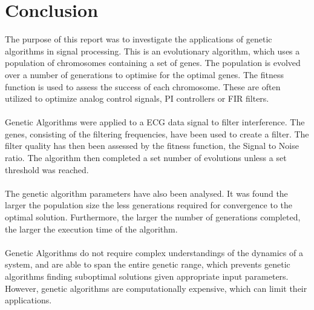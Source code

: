 \documentclass[a4paper, 11pt]{article}
\begin{document}
\section{Conclusion}\label{sec:conc}
    The purpose of this report was to investigate the applications of genetic algorithms in signal processing. This is an 
    evolutionary algorithm, which uses a population of chromosomes containing a set of genes. The population is evolved
    over a number of generations to optimise for the optimal genes. The fitness function is used to assess the success of each
    chromosome. These are often utilized to optimize analog control signals, PI controllers or FIR filters.  
    \\\\
    Genetic Algorithms were applied to a ECG data signal to filter interference. The genes, consisting of the filtering frequencies, 
    have been used to create a filter. The filter quality has then been assessed by the fitness function, the Signal to Noise
    ratio. The algorithm then completed a set number of evolutions unless a set threshold was reached. 
    \\\\
    The genetic algorithm parameters have also been analysed. It was found the larger the population size the less generations
    required for convergence to the optimal solution. Furthermore, the larger the number of generations completed, the larger
    the execution time of the algorithm. 
    \\\\
    Genetic Algorithms do not require complex understandings of the dynamics of a system, and are able to span the entire
    genetic range, which prevents genetic algorithms finding suboptimal solutions given appropriate input parameters. However, 
    genetic algorithms are computationally expensive, which can limit their applications.  

    

\pagebreak

\renewcommand{\bibname}{References}
\renewcommand{\bibsection}{\section{\bibname}}
\renewcommand{\cite}{\citep}

\pagebreak
\end{document}

